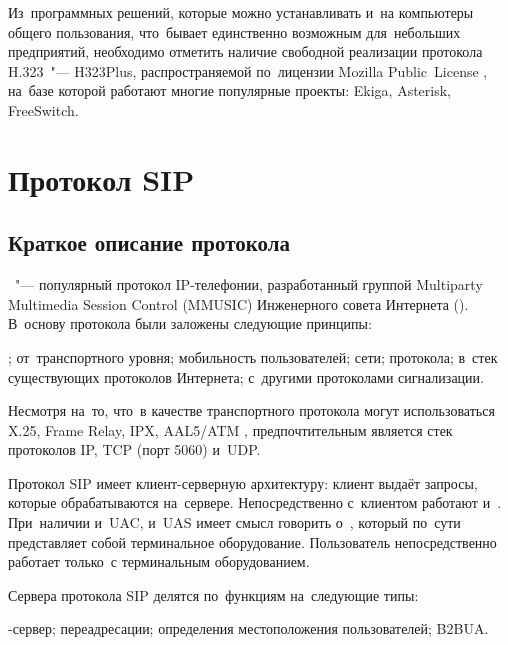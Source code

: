 Из~программных решений, которые можно устанавливать и~на компьютеры общего пользования, что~бывает единственно возможным для~небольших предприятий, необходимо отметить наличие свободной реализации протокола H.323~"--- H323Plus, распространяемой по~лицензии Mozilla Public~License , на~базе которой работают многие популярные проекты: Ekiga, Asterisk, FreeSwitch.

\section{Протокол SIP}

\subsection{Краткое описание протокола}

~"--- популярный протокол IP-телефонии, разработанный группой Multiparty Multimedia Session Control (MMUSIC) Инженерного совета Интернета ().
В~основу протокола были заложены следующие принципы:\listnopagebreak
\begin{itemize}
    ;
		 от~транспортного уровня;
		 мобильность пользователей;
		 сети;
		 протокола;
		 в~стек существующих протоколов Интернета;
		 с~другими протоколами сигнализации.
\end{itemize}

Несмотря на~то, что~в качестве транспортного протокола могут использоваться X.25, Frame Relay, IPX, AAL5/ATM \etc, предпочтительным является стек протоколов IP, TCP (порт 5060) и~UDP.

Протокол SIP имеет клиент-серверную архитектуру: клиент выдаёт запросы, которые обрабатываются на~сервере.
Непосредственно с~клиентом работают  и~.
При~наличии и~UAC, и~UAS имеет смысл говорить о~, который по~сути представляет собой терминальное оборудование.
Пользователь непосредственно работает только~с терминальным оборудованием.

Сервера протокола SIP делятся по~функциям на~следующие типы:
\begin{itemize}
    -сервер;
		 переадресации;
		 определения местоположения пользователей;
		 B2BUA.
\end{itemize}


